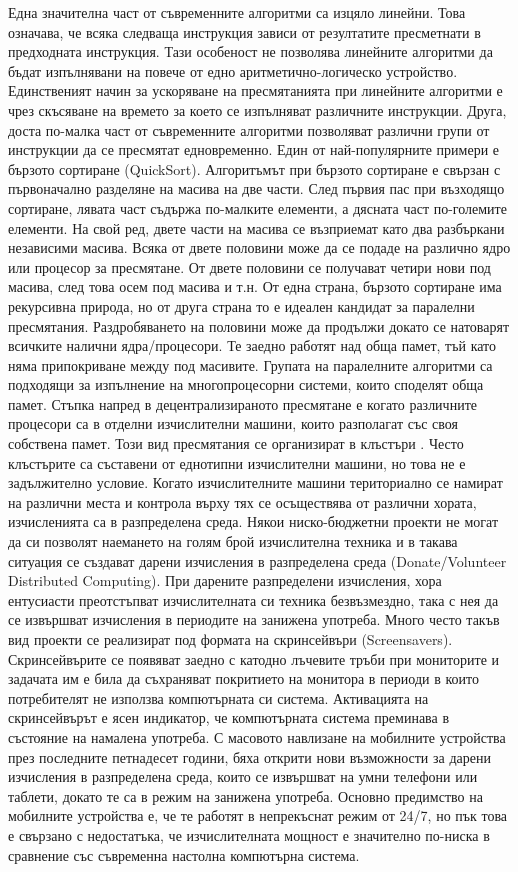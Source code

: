 Една значителна част от съвременните алгоритми са изцяло линейни. Това означава, че всяка следваща инструкция зависи от резултатите пресметнати в предходната инструкция. Тази особеност не позволява линейните алгоритми да бъдат изпълнявани на повече от едно аритметично-логическо устройство. Единственият начин за ускоряване на пресмятанията при линейните алгоритми е чрез скъсяване на времето за което се изпълняват различните инструкции. Друга, доста по-малка част от съвременните алгоритми позволяват различни групи от инструкции да се пресмятат едновременно. Един от най-популярните примери е бързото сортиране (QuickSort). Алгоритъмът при бързото сортиране е свързан с първоначално разделяне на масива на две части. След първия пас при възходящо сортиране, лявата част съдържа по-малките елементи, а дясната част по-големите елементи. На свой ред, двете части на масива се възприемат като два разбъркани независими масива. Всяка от двете половини може да се подаде на различно ядро или процесор за пресмятане. От двете половини се получават четири нови под масива, след това осем под масива и т.н. От една страна, бързото сортиране има рекурсивна природа, но от друга страна то е идеален кандидат за паралелни пресмятания. Раздробяването на половини може да продължи докато се натоварят всичките налични ядра/процесори. Те заедно работят над обща памет, тъй като няма припокриване между под масивите. Групата на паралелните алгоритми са подходящи за изпълнение на многопроцесорни системи, които споделят обща памет. Стъпка напред в децентрализираното пресмятане е когато различните процесори са в отделни изчислителни машини, които разполагат със своя собствена памет. Този вид пресмятания се организират в клъстъри \cite{Desell-02}. Често клъстърите са съставени от еднотипни изчислителни машини, но това не е задължително условие. Когато изчислителните машини териториално се намират на различни места и контрола върху тях се осъществява от различни хората, изчисленията са в разпределена среда. Някои ниско-бюджетни проекти не могат да си позволят наемането на голям брой изчислителна техника и в такава ситуация се създават дарени изчисления в разпределена среда (Donate/Volunteer Distributed Computing). При дарените разпределени изчисления, хора ентусиасти преотстъпват изчислителната си техника безвъзмездно, така с нея да се извършват изчисления в периодите на занижена употреба. Много често такъв вид проекти се реализират под формата на скринсейвъри (Screensavers). Скринсейвърите се появяват заедно с катодно лъчевите тръби при мониторите и задачата им е била да съхраняват покритието на монитора в периоди в които потребителят не използва компютърната си система. Активацията на скринсейвърът е ясен индикатор, че компютърната система преминава в състояние на намалена употреба. С масовото навлизане на мобилните устройства през последните петнадесет години, бяха открити нови възможности за дарени изчисления в разпределена среда, които се извършват на умни телефони или таблети, докато те са в режим на занижена употреба. Основно предимство на мобилните устройства е, че те работят в непрекъснат режим от 24/7, но пък това е свързано с недостатъка, че изчислителната мощност е значително по-ниска в сравнение със съвременна настолна компютърна система. 

